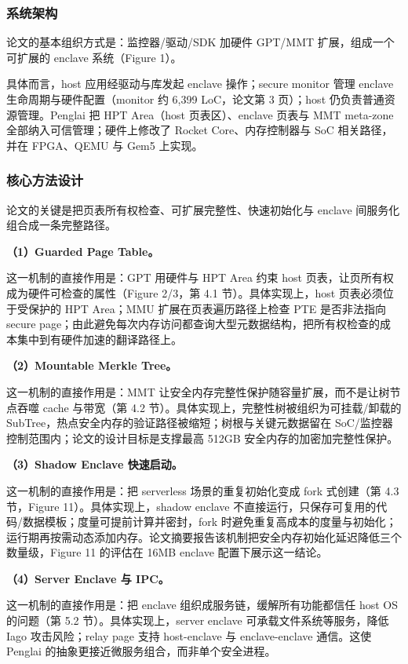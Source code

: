 \documentclass[11pt]{ctexart}
\begin{document}
\subsubsection{系统架构}
论文的基本组织方式是：监控器/驱动/SDK 加硬件 GPT/MMT 扩展，组成一个可扩展的 enclave 系统（Figure 1）。\par
具体而言，host 应用经驱动与库发起 enclave 操作；secure monitor 管理 enclave 生命周期与硬件配置（monitor 约 6,399 LoC，论文第 3 页）；host 仍负责普通资源管理。Penglai 把 HPT Area（host 页表区）、enclave 页表与 MMT meta-zone 全部纳入可信管理；硬件上修改了 Rocket Core、内存控制器与 SoC 相关路径，并在 FPGA、QEMU 与 Gem5 上实现。\par
\subsubsection{核心方法设计}
论文的关键是把页表所有权检查、可扩展完整性、快速初始化与 enclave 间服务化组合成一条完整路径。\par
\noindent\textbf{（1）Guarded Page Table。}\par
这一机制的直接作用是：GPT 用硬件与 HPT Area 约束 host 页表，让页所有权成为硬件可检查的属性（Figure 2/3，第 4.1 节）。具体实现上，host 页表必须位于受保护的 HPT Area；MMU 扩展在页表遍历路径上检查 PTE 是否非法指向 secure page；由此避免每次内存访问都查询大型元数据结构，把所有权检查的成本集中到有硬件加速的翻译路径上。\par
\noindent\textbf{（2）Mountable Merkle Tree。}\par
这一机制的直接作用是：MMT 让安全内存完整性保护随容量扩展，而不是让树节点吞噬 cache 与带宽（第 4.2 节）。具体实现上，完整性树被组织为可挂载/卸载的 SubTree，热点安全内存的验证路径被缩短；树根与关键元数据留在 SoC/监控器控制范围内；论文的设计目标是支撑最高 512GB 安全内存的加密加完整性保护。\par
\noindent\textbf{（3）Shadow Enclave 快速启动。}\par
这一机制的直接作用是：把 serverless 场景的重复初始化变成 fork 式创建（第 4.3 节，Figure 11）。具体实现上，shadow enclave 不直接运行，只保存可复用的代码/数据模板；度量可提前计算并密封，fork 时避免重复高成本的度量与初始化；运行期再按需动态添加内存。论文摘要报告该机制把安全内存初始化延迟降低三个数量级，Figure 11 的评估在 16MB enclave 配置下展示这一结论。\par
\noindent\textbf{（4）Server Enclave 与 IPC。}\par
这一机制的直接作用是：把 enclave 组织成服务链，缓解所有功能都信任 host OS 的问题（第 5.2 节）。具体实现上，server enclave 可承载文件系统等服务，降低 Iago 攻击风险；relay page 支持 host-enclave 与 enclave-enclave 通信。这使 Penglai 的抽象更接近微服务组合，而非单个安全进程。\par
\end{document}
